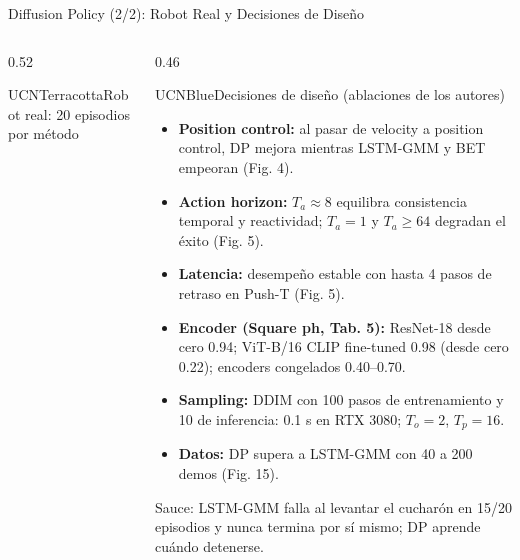 \documentclass[aspectratio=169,10pt,xcolor={dvipsnames,table}]{beamer}
\newcommand{\CardHeightTall}{46mm}         %
\newcommand{\NoteFont}{\fontsize{5.6}{6.9}\selectfont}                  %
\newcommand{\TabFont}{\fontsize{5.3}{6.4}\selectfont}                    %
\begin{document}
\begin{frame}{Diffusion Policy (2/2): Robot Real y Decisiones de Diseño}
\begin{columns}[T, onlytextwidth]
\begin{column}{0.52\textwidth}
\begin{Card}[height=\CardHeightTall, space to=\EspacioLibre]{UCNTerracotta}{Robot real: 20 episodios por método}
      \end{Card}
    \end{column}
    \begin{column}{0.46\textwidth}
      \begin{Card}[height=\CardHeightTall]{UCNBlue}{Decisiones de diseño (ablaciones de los autores)}
        {\NoteFont
        \begin{itemize}\setlength{\itemsep}{1pt}
          \item[\textcolor{UCNBlue}{$\blacktriangleright$}] \textbf{Position control:} al pasar de velocity a position control, DP mejora mientras LSTM-GMM y BET empeoran (Fig. 4).
          \item[\textcolor{UCNBlue}{$\blacktriangleright$}] \textbf{Action horizon:} $T_a \approx 8$ equilibra consistencia temporal y reactividad; $T_a = 1$ y $T_a \geq 64$ degradan el éxito (Fig. 5).
          \item[\textcolor{UCNBlue}{$\blacktriangleright$}] \textbf{Latencia:} desempeño estable con hasta 4 pasos de retraso en Push-T (Fig. 5).
          \item[\textcolor{UCNBlue}{$\blacktriangleright$}] \textbf{Encoder (Square ph, Tab. 5):} ResNet-18 desde cero 0.94; ViT-B/16 CLIP fine-tuned 0.98 (desde cero 0.22); encoders congelados 0.40--0.70.
          \item[\textcolor{UCNBlue}{$\blacktriangleright$}] \textbf{Sampling:} DDIM con 100 pasos de entrenamiento y 10 de inferencia: 0.1 s en RTX 3080; $T_o = 2$, $T_p = 16$.
          \item[\textcolor{UCNBlue}{$\blacktriangleright$}] \textbf{Datos:} DP supera a LSTM-GMM con 40 a 200 demos (Fig. 15).
        \end{itemize}
        \vspace{0.6mm}
        {\TabFont\textcolor{TextDark!75}{Sauce: LSTM-GMM falla al levantar el cucharón en 15/20 episodios y nunca termina por sí mismo; DP aprende cuándo detenerse.}\par}}
      \end{Card}
    \end{column}
  \end{columns}
\end{frame}
\end{document}
